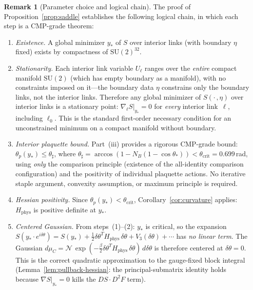 \documentclass[11pt]{article}
\theoremstyle{definition}
\newtheorem{remark}[theorem]{Remark}
\newcommand{\SU}{\mathrm{SU}}
\begin{document}
\begin{remark}[Parameter choice and logical chain]%
\label{rem:parameters}
The proof of Proposition~\ref{prop:saddle} establishes the
following logical chain, in which each step is a CMP-grade
theorem:

\begin{enumerate}
\item \emph{Existence.}  A global minimizer $y_*$ of $S$ over
interior links (with boundary $\eta$ fixed) exists by
compactness of $\SU(2)^{32}$.

\item \emph{Stationarity.}  Each interior link variable
$U_\ell$ ranges over the \emph{entire} compact manifold
$\SU(2)$ (which has empty boundary as a manifold),
with no constraints imposed on it---the boundary data $\eta$
constrains only the boundary links, not the interior links.
Therefore any global minimizer of $S(\cdot\,,\eta)$ over
interior links is a stationary
point: $\nabla_\ell S|_{y_*}=0$ for \emph{every} interior
link~$\ell$, including $\ell_0$.  This is the standard
first-order necessary condition for an unconstrained minimum
on a compact manifold without boundary.

\item \emph{Interior plaquette bound.}  Part~(iii) provides a
rigorous CMP-grade bound: $\theta_p(y_*)\le\theta_\sharp$,
where $\theta_\sharp=\arccos(1-N_B(1-\cos\theta_*))
<\theta_{\mathrm{crit}}=0.699$\,rad, using \emph{only} the
comparison principle (existence of the all-identity
comparison configuration) and the positivity of individual
plaquette actions.  No iterative staple argument, convexity
assumption, or maximum principle is required.

\item \emph{Hessian positivity.}
Since $\theta_p(y_*)<\theta_{\mathrm{crit}}$,
Corollary~\ref{cor:curvature} applies: $H_{\mathrm{phys}}$
is positive definite at $y_*$.

\item \emph{Centered Gaussian.}
From steps~(1)--(2): $y_*$ is critical, so the expansion
$S(y_*\cdot e^{i\delta\theta})
=S(y_*)+\frac{1}{2}\delta\theta^T H_{\mathrm{phys}}\,\delta\theta
+V_3(\delta\theta)+\cdots$
has \emph{no linear term}.  The Gaussian
$d\mu_C=\mathcal{N}\,\exp(-\frac{\beta}{2}\delta\theta^T
H_{\mathrm{phys}}\,\delta\theta)\,d\delta\theta$
is therefore centered at $\delta\theta=0$.  This is the
correct quadratic approximation to the gauge-fixed block
integral (Lemma~\ref{lem:pullback-hessian}: the
principal-submatrix identity holds because $\nabla S|_{y_*}=0$
kills the $DS\cdot D^2 F$ term).


\end{enumerate}
\end{remark}
\end{document}
